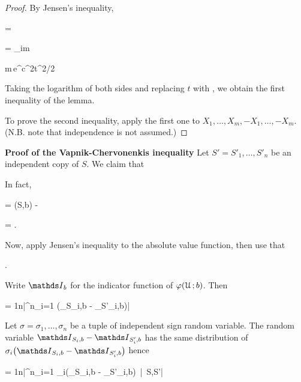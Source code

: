 \documentclass[scombinatorics.tex]{subfiles}
\begin{document}
\begin{proof}
  By Jensen's inequality,

  {\le}
  {\Ex{}}

  \ceq{}
  {=}
  {\Ex{}}

  \ceq{}
  {\le}
  {\Ex{}}

  \ceq{}
  {=}
  {\sum_{i\le m}\Ex\big[ e^{t X_i}\big]}

  \ceq{}
  {\le}
  {m\,e^{c^2t^2/2}}

  Taking the logarithm of both sides and replacing $t$ with , we obtain the first inequality of the lemma.

  To prove the second inequality, apply the first one to $X_1,\dots,X_m, -X_1,\dots,-X_m$.
  (N.B. note that independence is not assumed.)
\end{proof}

\textbf{Proof of the Vapnik-Chervonenkis inequality}
  Let $S'=S'_1,\dots,S'_n$ be an independent copy of $S$.
  We claim that

  {\le}
  {\Ex{}}

  In fact,

  {=}
  {\Fr(S,b) - \Ex\big[\Fr(S',b)\big]}

  \ceq{}
  {=}
  {\Ex{}.}

  Now, apply Jensen's inequality to the absolute value function, then use that 

  {\le}
  {\Ex{}.}

  Write $\Indicator_b$ for the indicator function of $\varphi(\EuScript U\,;b)$.
  Then

  {=}
  {\frac1n\bigg|\sum^n_{i=1} \Big(\Indicator_{S_i,b} -  \Indicator_{S'_i,b}\Big)\bigg|}

  Let $\sigma=\sigma_1,\dots,\sigma_n$ be a tuple of independent sign random variable.
  The random variable $\Indicator_{S_i,b} -  \Indicator_{S'_i,b}$ has the same distribution of $\sigma_i\big(\Indicator_{S_i,b} -  \Indicator_{S'_i,b}\big)$ hence

  \ceq{}
  {=}
  {\frac1n\Ex\bigg|\sum^n_{i=1} \sigma_i\Big(\Indicator_{S_i,b} -  \Indicator_{S'_i,b}\Big)\ \Big|\ S,S'\bigg|}
\end{document}
